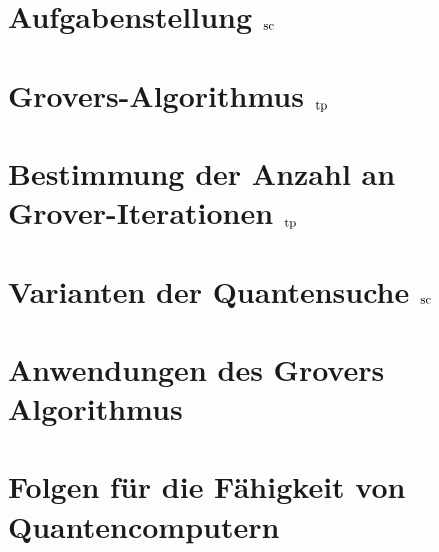 \documentclass[utf8,biblatex]{lni}
\begin{document}
\section{Aufgabenstellung $\mathbf{\textsubscript{\small sc}}$}


\section{Grovers-Algorithmus $\mathbf{\textsubscript{\small tp}}$}


\section{Bestimmung der Anzahl an Grover-Iterationen $\mathbf{\textsubscript{\small tp}}$}

\label{sec:geoVer}

\section{Varianten der Quantensuche $\mathbf{\textsubscript{\small sc}}$}


\section{Anwendungen des Grovers Algorithmus}


\section{Folgen für die Fähigkeit von Quantencomputern }

\end{document}
